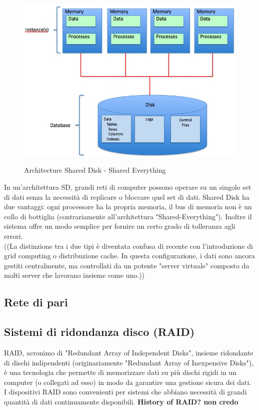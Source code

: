 \begin{figure}[htbp]
\centering
\includegraphics[scale=0.40]{img/Shared_Disk_Architecture.jpg}\\
\caption{Architecture Shared Disk - Shared Everything \label{figura1.2} \cite{etichetta7}}
\end{figure}

In un'architettura SD, grandi reti di computer possono operare su un singolo set di dati senza la necessit\`{a} di replicare o bloccare quel set di dati.\cite{etichetta7}
Shared Disk ha due vantaggi: ogni processore ha la propria memoria, il bus di memoria non \`{e} un collo di bottiglia (contrariamente all'architettura "Shared-Everything"). Inoltre il sistema offre un modo semplice per fornire un certo grado di tolleranza agli errori.\\

((La distinzione tra i due tipi \`{e} diventata confusa di recente con l'introduzione di grid computing o distribuzione cache. In questa configurazione, i dati sono ancora gestiti centralmente, ma controllati da un potente "server virtuale" composto da molti server che lavorano insieme come uno.\cite{etichetta2}))
\item
\subsection{Rete di pari}

\item
\subsection{Sistemi di ridondanza disco (RAID)}
RAID, acronimo di "Redundant Array of Independent Disks", insieme ridondante di dischi indipendenti (originariamente "Redundant Array of Inexpensive Disks"), \`{e} una tecnologia che permette di memorizzare dati su pi\`{u} dischi rigidi in un computer (o collegati ad esso) in modo da garantire una gestione sicura dei dati\cite{etichetta9}. I dispositivi RAID sono convenienti per sistemi che abbiano necessit\`{a} di grandi quantit\`{a} di dati continuamente disponibili. \textbf{History of RAID? non credo}

